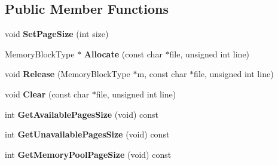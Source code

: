 \subsection*{Public Member Functions}
\begin{DoxyCompactItemize}
\item 
\hypertarget{class_data_structures_1_1_memory_pool_a92a68a997a047d96bb08bee6ea84858a}{void {\bfseries Set\-Page\-Size} (int size)}\label{class_data_structures_1_1_memory_pool_a92a68a997a047d96bb08bee6ea84858a}

\item 
\hypertarget{class_data_structures_1_1_memory_pool_af59cca601f390601953e37c46deca03a}{Memory\-Block\-Type $\ast$ {\bfseries Allocate} (const char $\ast$file, unsigned int line)}\label{class_data_structures_1_1_memory_pool_af59cca601f390601953e37c46deca03a}

\item 
\hypertarget{class_data_structures_1_1_memory_pool_abd282ac19fb6b29ee31c7e11d3b6131d}{void {\bfseries Release} (Memory\-Block\-Type $\ast$m, const char $\ast$file, unsigned int line)}\label{class_data_structures_1_1_memory_pool_abd282ac19fb6b29ee31c7e11d3b6131d}

\item 
\hypertarget{class_data_structures_1_1_memory_pool_a2e91807b7e7fe95ee3c3d503fb8e6207}{void {\bfseries Clear} (const char $\ast$file, unsigned int line)}\label{class_data_structures_1_1_memory_pool_a2e91807b7e7fe95ee3c3d503fb8e6207}

\item 
\hypertarget{class_data_structures_1_1_memory_pool_a471c10ff881d72135a4a4c009266748b}{int {\bfseries Get\-Available\-Pages\-Size} (void) const }\label{class_data_structures_1_1_memory_pool_a471c10ff881d72135a4a4c009266748b}

\item 
\hypertarget{class_data_structures_1_1_memory_pool_a4f036052f87ef2a41c3277cab07ce321}{int {\bfseries Get\-Unavailable\-Pages\-Size} (void) const }\label{class_data_structures_1_1_memory_pool_a4f036052f87ef2a41c3277cab07ce321}

\item 
\hypertarget{class_data_structures_1_1_memory_pool_a8a1dff41f49d4e18e6fe4a2d13a6f3f2}{int {\bfseries Get\-Memory\-Pool\-Page\-Size} (void) const }\label{class_data_structures_1_1_memory_pool_a8a1dff41f49d4e18e6fe4a2d13a6f3f2}

\end{DoxyCompactItemize}
